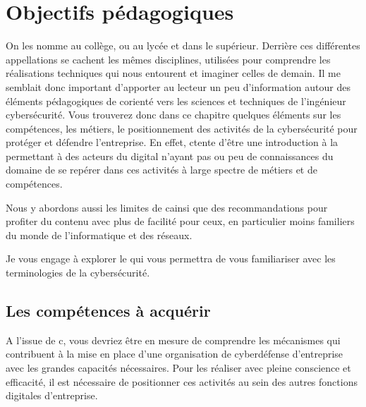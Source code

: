 %
%
 
\section{Objectifs pédagogiques}

On les nomme  au collège,  ou  au lycée et dans le supérieur. Derrière ces différentes appellations se cachent les mêmes disciplines, utilisées pour comprendre les réalisations techniques qui nous entourent et imaginer celles de demain.
Il me semblait donc important d'apporter au lecteur un peu d'information autour des éléments pédagogiques de c\ecours  orienté vers les sciences et techniques de l'ingénieur cybersécurité. Vous trouverez donc dans ce chapitre quelques éléments sur les compétences, les métiers, le positionnement des activités de la cybersécurité pour protéger et défendre  l'entreprise.
En effet, c\ecours tente d'être une introduction à la \etitle permettant à des acteurs du digital n'ayant pas ou peu de connaissances du domaine de se repérer dans ces activités à large spectre de métiers et de compétences.


Nous y abordons aussi les limites de c\ecours ainsi que des recommandations pour profiter du contenu avec plus de facilité pour ceux, en particulier moins familiers du monde de l'informatique et des réseaux.

Je vous engage à explorer le   qui vous permettra de vous familiariser avec les terminologies de la cybersécurité.

\subsection{Les compétences à acquérir}
A l'issue de c\ecours, vous devriez être en mesure de comprendre les mécanismes qui contribuent à la mise en place d'une organisation de cyberdéfense d'entreprise avec les grandes capacités nécessaires. Pour les réaliser avec pleine conscience et efficacité, il est nécessaire de positionner ces activités au sein des autres fonctions digitales  d'entreprise. 

